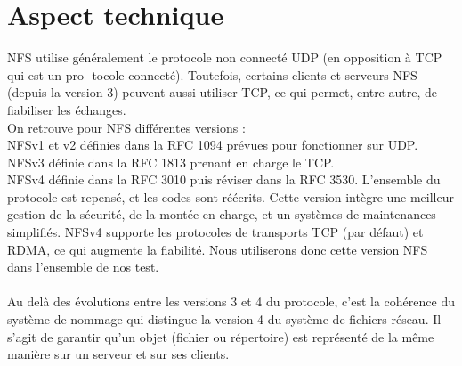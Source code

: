 \documentclass[12pt]{report}
\begin{document}
		\section{Aspect technique}
		
		NFS utilise généralement le protocole non connecté UDP (en opposition à TCP qui est un pro-
    tocole connecté). Toutefois, certains clients et serveurs NFS (depuis la version 3) peuvent aussi
    utiliser TCP, ce qui permet, entre autre, de fiabiliser les échanges.\\

    On retrouve pour NFS différentes versions :\\
    NFSv1 et v2 définies dans la RFC 1094 prévues pour fonctionner sur UDP.\\
    NFSv3 définie dans la RFC 1813 prenant en charge le TCP.\\
    NFSv4 définie dans la RFC 3010 puis réviser dans la RFC 3530. L'ensemble du protocole est repensé, et les codes sont réécrits.
    Cette version intègre une meilleur gestion de la sécurité, de la montée en charge, et un systèmes de maintenances simplifiés.
    NFSv4 supporte les protocoles de transports TCP (par défaut) et RDMA, ce qui augmente la fiabilité. Nous utiliserons donc cette version NFS dans l'ensemble de nos test.\\\\
Au delà des évolutions entre les versions 3 et 4 du protocole, c'est la cohérence du système de nommage qui distingue la version 4 du système de fichiers réseau. Il s'agit de garantir qu'un objet (fichier ou répertoire) est représenté de la même manière sur un serveur et sur ses clients.
\newpage
\end{document}
